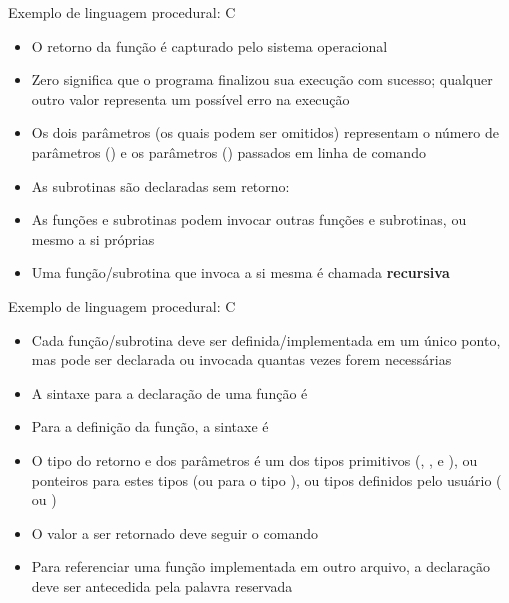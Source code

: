 \begin{frame}[fragile]{Exemplo de linguagem procedural: C}

    \begin{itemize}
        \item O retorno da função  é capturado pelo sistema operacional

        \item Zero significa que o programa finalizou sua execução com sucesso; qualquer outro
            valor representa um possível erro na execução

        \item Os dois parâmetros (os quais podem ser omitidos) representam o número de parâmetros
            () e os parâmetros () passados em linha de comando

        \item As subrotinas são declaradas sem retorno:


        \item As funções e subrotinas podem invocar outras funções e subrotinas, ou mesmo a si
            próprias

        \item Uma função/subrotina que invoca a si mesma é chamada \textbf{recursiva}
    \end{itemize}

\end{frame}

\begin{frame}[fragile]{Exemplo de linguagem procedural: C}

    \begin{itemize}
        \item Cada função/subrotina deve ser definida/implementada em um único ponto, mas pode
            ser declarada ou invocada quantas vezes forem necessárias

        \item A sintaxe para a declaração de uma função é


        \item Para a definição da função, a sintaxe é

        \item O tipo do retorno e dos parâmetros é um dos tipos primitivos (,
            ,  e ), ou ponteiros para estes tipos
            (ou para o tipo ), ou tipos definidos pelo usuário ( ou
                )

        \item O valor a ser retornado deve seguir o comando 

        \item Para referenciar uma função implementada em outro arquivo, a declaração deve ser
            antecedida pela palavra reservada 
    \end{itemize}

\end{frame}


